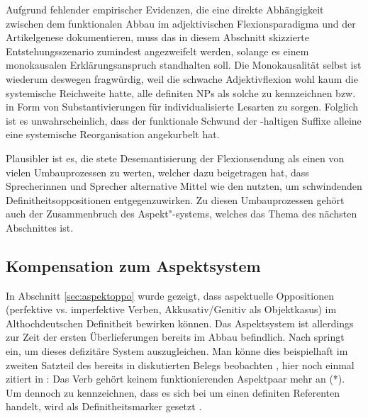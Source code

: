 Aufgrund fehlender empirischer Evidenzen, die eine direkte Abhängigkeit zwischen dem funktionalen Abbau im adjektivischen Flexionsparadigma und der Artikelgenese dokumentieren, muss das in diesem Abschnitt skizzierte Entstehungsszenario  zumindest angezweifelt werden, solange es einem monokausalen Erklärungsanspruch standhalten soll. Die Monokausalität selbst ist wiederum deswegen fragwürdig, weil  die schwache Adjektivflexion wohl kaum die systemische Reichweite hatte,  alle definiten NPs als solche zu kennzeichnen bzw. in Form von Substantivierungen  für individualisierte  Lesarten zu sorgen. Folglich ist es unwahrscheinlich, dass der funktionale Schwund der -haltigen Suffixe  alleine eine systemische Reorganisation angekurbelt hat. 

Plausibler ist es, die stete Desemantisierung der Flexionsendung als einen von vielen Umbauprozessen zu werten, welcher dazu beigetragen hat, dass Sprecherinnen und Sprecher alternative Mittel wie den  nutzten, um schwindenden Definitheitsoppositionen  entgegenzuwirken. Zu diesen Umbauprozessen gehört auch der Zusammenbruch des  Aspekt"-systems, welches das Thema des nächsten Abschnittes ist.

\subsection{Kompensation zum Aspektsystem} \label{aspekt}

In Abschnitt \ref{sec:aspektoppo} wurde gezeigt, dass aspektuelle  Oppositionen (perfektive vs. imperfektive Verben, Akkusativ/Genitiv als Objektkasus)  im Althochdeutschen De\-fi\-nit\-heit bewirken können. Das Aspektsystem  ist allerdings zur Zeit der ersten Überlieferungen bereits im Abbau befindlich. Nach  \textcite{Leiss1994,Leiss2000,Leiss2010} springt  ein, um dieses defizitäre System auszugleichen. Man könne dies beispielhaft im zweiten Satzteil des bereits in  diskutierten Belegs beobachten \parencite[180--181]{Leiss2000}, hier noch einmal zitiert in : Das Verb  gehört keinem funktionierenden Aspektpaar  mehr an (*). Um dennoch zu kennzeichnen, dass es sich bei  um einen definiten Referenten handelt, wird  als Definitheitsmarker  gesetzt \parencite[181]{Leiss2000}.


